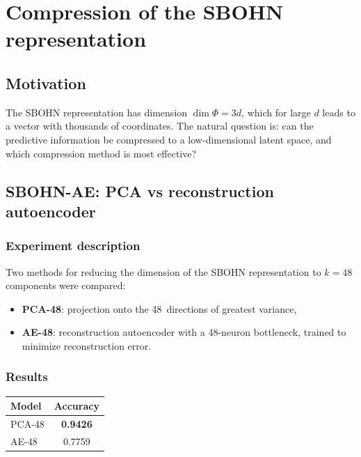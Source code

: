 \documentclass[11pt,a4paper]{report}
\begin{document}

\section{Compression of the SBOHN representation}\label{sec:sbohn_compression}

\subsection{Motivation}

The SBOHN representation has dimension $\dim\Phi = 3d$, which for large $d$ leads to a vector with thousands of coordinates. The natural question is: can the predictive information be compressed to a low-dimensional latent space, and which compression method is most effective?

\subsection{SBOHN-AE: PCA vs reconstruction autoencoder}

\subsubsection{Experiment description}

Two methods for reducing the dimension of the SBOHN representation to $k=48$ components were compared:
\begin{itemize}
\item \textbf{PCA-48}: projection onto the 48~directions of greatest variance,
\item \textbf{AE-48}: reconstruction autoencoder with a 48-neuron bottleneck, trained to minimize reconstruction error.
\end{itemize}

\subsubsection{Results}

\begin{center}
\begin{tabular}{lc}
\toprule
Model & Accuracy \\
\midrule
PCA-48 & \textbf{0.9426} \\
AE-48 & 0.7759 \\
\bottomrule
\end{tabular}
\end{center}
\end{document}
